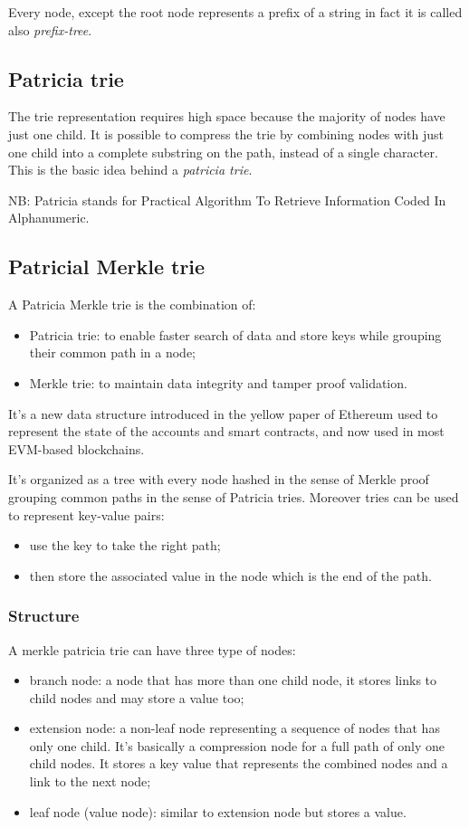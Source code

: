 Every node, except the root node represents a prefix of a string in fact it is called also \emph{prefix-tree}.

\subsection{Patricia trie}
The trie representation requires high space because the majority of nodes have just one child.
It is possible to compress the trie by combining nodes with just one child into a complete substring on the path, instead of a single character.
This is the basic idea behind a \emph{patricia trie}.

NB: Patricia stands for Practical Algorithm To Retrieve Information Coded In Alphanumeric.

\subsection{Patricial Merkle trie}
A Patricia Merkle trie is the combination of:
\begin{itemize}
    \item Patricia trie: to enable faster search of data and store keys while grouping their common path in a node;
    \item Merkle trie: to maintain data integrity and tamper proof validation.
\end{itemize}
It's a new data structure introduced in the yellow paper of Ethereum used to represent the state of the accounts and smart contracts, and now used in most EVM-based blockchains.

It's organized as a tree with every node hashed in the sense of Merkle proof grouping common paths in the sense of Patricia tries.
Moreover tries can be used to represent key-value pairs:
\begin{itemize}
    \item use the key to take the right path;
    \item then store the associated value in the node which is the end of the path.
\end{itemize}

\subsubsection{Structure}
A merkle patricia trie can have three type of nodes:
\begin{itemize}
    \item branch node: a node that has more than one child node, it stores links to child nodes and may store a value too;
    \item extension node: a non-leaf node representing a sequence of nodes that has only one child.
    It's basically a compression node for a full path of only one child nodes.
    It stores a key value that represents the combined nodes and a link to the next node;
    \item leaf node (value node): similar to extension node but stores a value.
\end{itemize}

